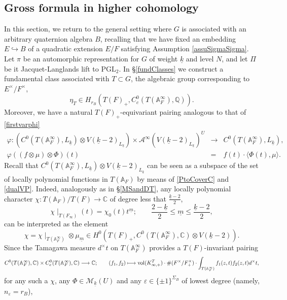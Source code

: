 \documentclass{amsart}
\theoremstyle{definition}
\theoremstyle{remark}
\numberwithin{equation}{section}
\newcommand{\PGL}{{\mathrm{PGL}}}
\newcommand{\A}{{\mathbb A}}
\newcommand{\Q}{{\mathbb Q}}
\newcommand{\C}{{\mathbb C}}
\newcommand{\cA}{{\mathcal A}}
\newcommand{\cM}{{\mathcal M}}
\begin{document}
\subsection{Gross formula in higher cohomology}


In this section, we return to the general setting where $G$ is associated with an arbitrary quaternion algebra $B$, recalling that we have fixed an embedding $E\hookrightarrow B$ of a quadratic extension $E/F$ satisfying Assumption \ref{assuSigmaSigma}. Let $\pi$ be an automorphic representation for $G$ of weight $\underline k$ and level $N$, and let $\Pi$ be it Jacquet-Langlands lift to $\PGL_2$.
In \S \ref{fundClasses} we construct a fundamental class associated with $T\subset G$, the algebraic group corresponding to $E^\times/F^\times$,
\[
\eta_T\in H_{r_B}(T(F)_+,C^0_c(T(\A_F^\infty),\Q)).
\]
Moreover, we have a natural $T(F)_+$-equivariant pairing analogous to that of \eqref{firstvarphi}
\begin{eqnarray*}
\varphi:\left(C^0(T(\A_F^\infty),{L_{\underline k}})\otimes V(\underline{k}-2)_{L_{\underline k}}\right)\times \cA^{\infty}(V(\underline{k}-2)_{L_{\underline k}})^U&\longrightarrow& C^0(T(\A_F^\infty),L_{\underline k}),\\
\varphi((f\otimes\mu)\otimes\Phi)(t)&=&f(t)\cdot \langle\Phi(t),\mu\rangle.
\end{eqnarray*}
Recall that $C^0(T(\A_F^\infty),{L_{\underline k}})\otimes V(\underline{k}-2)_{L_{\underline k}}$ can be seen as a subspace of the set of locally polynomial functions in $T(\A_F)$ by means of \eqref{PtoCoverC} and \eqref{dualVP}. Indeed, analogously as in \S\ref{MSandDT}, any locally polynomial character $\chi:T(\A_F)/T(F)\rightarrow\C$ of degree less that $\frac{\underline k-2}{2}$, 
\[
\chi\mid_{T(F_\infty)}(t)=\chi_0(t)t^{\underline m};\qquad \frac{2-\underline k}{2}\leq\underline m\leq \frac{\underline k-2}{2},
\]
can be interpreted as the element
\[
\chi=\chi\mid_{T(\A_F^\infty)}\otimes\mu_{\underline m} \in H^0(T(F)_+,C^{0}(T(\A_F^\infty),\C)\otimes V(\underline{k}-2)).
\]
Since the Tamagawa measure $d^\times t$ on $T(\A_F^\infty)$ provides a $T(F)$-invariant pairing 
\begin{equation}\label{pairing2CC}
    C^0(T(\A^\infty_F),\C)\times C_c^0(T(\A_F^\infty),\C)\longrightarrow\C;\qquad (f_1,f_2)\longmapsto {\rm vol}(K^T_{\infty,+})\cdot\#( F^\times/F^\times_+)\cdot\int_{T(\A_F^\infty)}f_1(z,t)f_2(z,t)d^\times t,
\end{equation}
for any such a $\chi$, any $\Phi\in \cM_{\underline k}(U)$ and any $\varepsilon\in \{\pm 1\}^{\Sigma_B}$ of lowest degree (namely,  $n_\varepsilon=r_B$),
\end{document}
